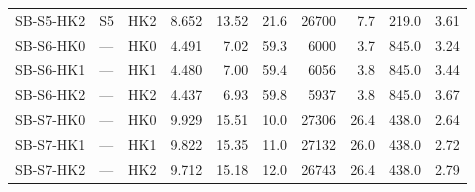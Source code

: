 \begin{table}[htbp]
\begin{tabular}{ll lrrrrrrr}
  SB-S5-HK2 & S5 & HK2 & 8.652 & 13.52 & 21.6 & 26700 & 7.7 & 219.0 & 3.61 \\
  SB-S6-HK0 & — & HK0 & 4.491 & 7.02 & 59.3 & 6000 & 3.7 & 845.0 & 3.24 \\
  SB-S6-HK1 & — & HK1 & 4.480 & 7.00 & 59.4 & 6056 & 3.8 & 845.0 & 3.44 \\
  SB-S6-HK2 & — & HK2 & 4.437 & 6.93 & 59.8 & 5937 & 3.8 & 845.0 & 3.67 \\
  SB-S7-HK0 & — & HK0 & 9.929 & 15.51 & 10.0 & 27306 & 26.4 & 438.0 & 2.64 \\
  SB-S7-HK1 & — & HK1 & 9.822 & 15.35 & 11.0 & 27132 & 26.0 & 438.0 & 2.72 \\
  SB-S7-HK2 & — & HK2 & 9.712 & 15.18 & 12.0 & 26743 & 26.4 & 438.0 & 2.79 \\
  \bottomrule
  \end{tabular}
\end{table}
